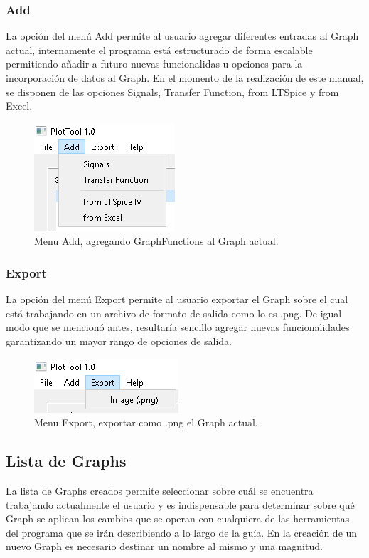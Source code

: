 \documentclass[a4paper,10pt]{article}
\begin{document}
\subsubsection{Add}
La opci\'on del men\'u Add permite al usuario agregar diferentes entradas al Graph actual, internamente el programa est\'a estructurado de forma escalable permitiendo a\~nadir a futuro nuevas funcionalidas u opciones para la incorporaci\'on de datos al Graph. En el momento de la realizaci\'on de este manual, se disponen de las
opciones Signals, Transfer Function, from LTSpice y from Excel.

\begin{figure}[H]
	\begin{center}
	\includegraphics[scale=0.8]{resources/menu_add.png}
	\caption{Menu Add, agregando GraphFunctions al Graph actual.}
	\end{center}
\end{figure}

\subsubsection{Export}
La opci\'on del men\'u Export permite al usuario exportar el Graph sobre el cual est\'a trabajando en un archivo
de formato de salida como lo es .png. De igual modo que se mencion\'o antes, resultar\'ia sencillo agregar nuevas funcionalidades garantizando un mayor rango de opciones de salida.

\begin{figure}[H]
	\begin{center}
	\includegraphics[scale=0.8]{resources/menu_export.png}
	\caption{Menu Export, exportar como .png el Graph actual.}
	\end{center}
\end{figure}

\subsection{Lista de Graphs}
La lista de Graphs creados permite seleccionar sobre cu\'al se encuentra trabajando actualmente el usuario y es indispensable para determinar sobre qu\'e Graph se aplican los cambios que se operan con cualquiera de las herramientas del programa que se ir\'an describiendo a lo largo de la gu\'ia. En la creaci\'on de un nuevo Graph
es necesario destinar un nombre al mismo y una magnitud.
\end{document}
